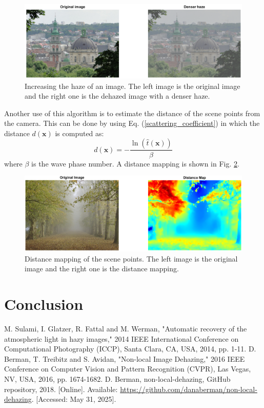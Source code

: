 \documentclass[conference]{IEEEtran}
\begin{document}
\begin{figure}
    \centering
    \includegraphics[width=\linewidth]{img/denser_haze.png}
    \caption{Increasing the haze of an image. The left image is the original image and the right one is the dehazed image with a denser haze.}
    \label{denser_haze}
\end{figure}
Another use of this algorithm is to estimate the distance of the scene points from the camera. This can be done by using Eq. (\ref{scattering_coefficient}) in which the distance $d(\mathbf{x})$ is computed as:
\begin{equation}
    d(\mathbf{x}) = -\frac{\ln(\hat{t}(\mathbf{x}))}{\beta}
\end{equation}
where $\beta$ is the wave phase number. A distance mapping is shown in Fig. \ref{distance_mapping}.
\begin{figure}
    \centering
    \includegraphics[width=\linewidth]{img/distance_mapping.png}
    \caption{Distance mapping of the scene points. The left image is the original image and the right one is the distance mapping.}
    \label{distance_mapping}
\end{figure}

\section{Conclusion}


\vspace{12pt}

\begin{thebibliography}{00}
 M. Sulami, I. Glatzer, R. Fattal and M. Werman, "Automatic recovery of the atmospheric light in hazy images," 2014 IEEE International Conference on Computational Photography (ICCP), Santa Clara, CA, USA, 2014, pp. 1-11.
 D. Berman, T. Treibitz and S. Avidan, "Non-local Image Dehazing," 2016 IEEE Conference on Computer Vision and Pattern Recognition (CVPR), Las Vegas, NV, USA, 2016, pp. 1674-1682.
D. Berman, non-local-dehazing, GitHub repository, 2018. [Online]. Available: \url{https://github.com/danaberman/non-local-dehazing}. [Accessed: May 31, 2025].
\end{thebibliography}
\end{document}
